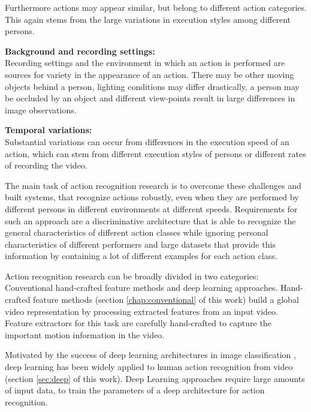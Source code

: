 Furthermore actions may appear similar, but belong to different action categories.
This again stems from the large variations in execution styles among different persons.

\textbf{Background and recording settings:} \\
Recording settings and the environment in which an action is performed are sources for variety in the appearance of an action.
There may be other moving objects behind a person, lighting conditions may differ drastically, a person may be occluded by an object and different view-points result in large differences in image observations.

\textbf{Temporal variations:} \\
Substantial variations can occur from differences in the execution speed of an action, which can stem from different execution styles of persons or different rates of recording the video.

The main task of action recognition research is to overcome these challenges and built systems, that recognize actions robustly, even when they are performed by different persons in different environments at different speeds.
Requirements for such an approach are a discriminative architecture that is able to recognize the general characteristics of different action classes while ignoring personal characteristics of different performers and large datasets that provide this information by containing a lot of different examples for each action class.

Action recognition research can be broadly divided in two categories: Conventional hand-crafted feature methods and deep learning approaches.
Hand-crafted feature methods (section \ref{chap:conventional} of this work) build a global video representation by processing extracted features from an input video.
Feature extractors for this task are carefully hand-crafted to capture the important motion information in the video.

Motivated by the success of deep learning architectures in image classification \cite{simonyan_very_2014, szegedy_going_2015, he_deep_2015}, deep learning has been widely applied to human action recognition from video (section \ref{sec:deep} of this work).
Deep Learning approaches require large amounts of input data, to train the parameters of a deep architecture for action recognition.

